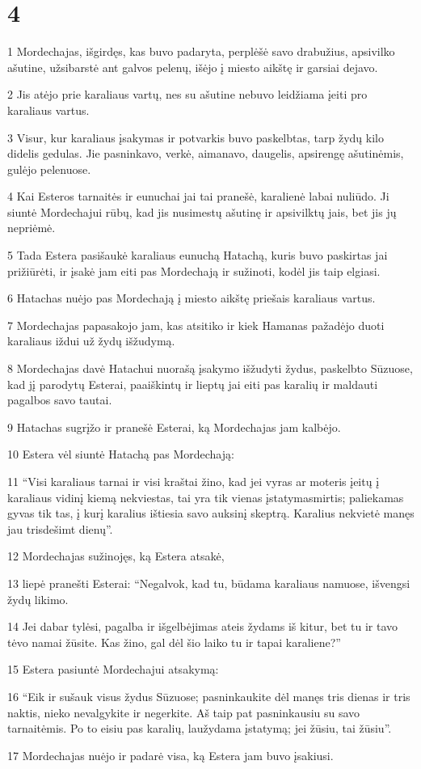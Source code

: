 \chapter{4}

\par 1 Mordechajas, išgirdęs, kas buvo padaryta, perplėšė savo drabužius, apsivilko ašutine, užsibarstė ant galvos pelenų, išėjo į miesto aikštę ir garsiai dejavo. 
\par 2 Jis atėjo prie karaliaus vartų, nes su ašutine nebuvo leidžiama įeiti pro karaliaus vartus. 
\par 3 Visur, kur karaliaus įsakymas ir potvarkis buvo paskelbtas, tarp žydų kilo didelis gedulas. Jie pasninkavo, verkė, aimanavo, daugelis, apsirengę ašutinėmis, gulėjo pelenuose. 
\par 4 Kai Esteros tarnaitės ir eunuchai jai tai pranešė, karalienė labai nuliūdo. Ji siuntė Mordechajui rūbų, kad jis nusimestų ašutinę ir apsivilktų jais, bet jis jų nepriėmė. 
\par 5 Tada Estera pasišaukė karaliaus eunuchą Hatachą, kuris buvo paskirtas jai prižiūrėti, ir įsakė jam eiti pas Mordechają ir sužinoti, kodėl jis taip elgiasi. 
\par 6 Hatachas nuėjo pas Mordechają į miesto aikštę priešais karaliaus vartus. 
\par 7 Mordechajas papasakojo jam, kas atsitiko ir kiek Hamanas pažadėjo duoti karaliaus iždui už žydų išžudymą. 
\par 8 Mordechajas davė Hatachui nuorašą įsakymo išžudyti žydus, paskelbto Sūzuose, kad jį parodytų Esterai, paaiškintų ir lieptų jai eiti pas karalių ir maldauti pagalbos savo tautai. 
\par 9 Hatachas sugrįžo ir pranešė Esterai, ką Mordechajas jam kalbėjo. 
\par 10 Estera vėl siuntė Hatachą pas Mordechają: 
\par 11 “Visi karaliaus tarnai ir visi kraštai žino, kad jei vyras ar moteris įeitų į karaliaus vidinį kiemą nekviestas, tai yra tik vienas įstatymas­mirtis; paliekamas gyvas tik tas, į kurį karalius ištiesia savo auksinį skeptrą. Karalius nekvietė manęs jau trisdešimt dienų”. 
\par 12 Mordechajas sužinojęs, ką Estera atsakė, 
\par 13 liepė pranešti Esterai: “Negalvok, kad tu, būdama karaliaus namuose, išvengsi žydų likimo. 
\par 14 Jei dabar tylėsi, pagalba ir išgelbėjimas ateis žydams iš kitur, bet tu ir tavo tėvo namai žūsite. Kas žino, gal dėl šio laiko tu ir tapai karaliene?” 
\par 15 Estera pasiuntė Mordechajui atsakymą: 
\par 16 “Eik ir sušauk visus žydus Sūzuose; pasninkaukite dėl manęs tris dienas ir tris naktis, nieko nevalgykite ir negerkite. Aš taip pat pasninkausiu su savo tarnaitėmis. Po to eisiu pas karalių, laužydama įstatymą; jei žūsiu, tai žūsiu”. 
\par 17 Mordechajas nuėjo ir padarė visa, ką Estera jam buvo įsakiusi.



